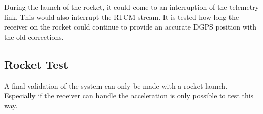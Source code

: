 During the launch of the rocket, it could come to an interruption of the telemetry link.
This would also interrupt the RTCM stream.
It is tested how long the receiver on the rocket could continue to provide an accurate DGPS position with the old corrections.

\subsection{Rocket Test}

A final validation of the system can only be made with a rocket launch.
Especially if the receiver can handle the acceleration is only possible to test this way.

